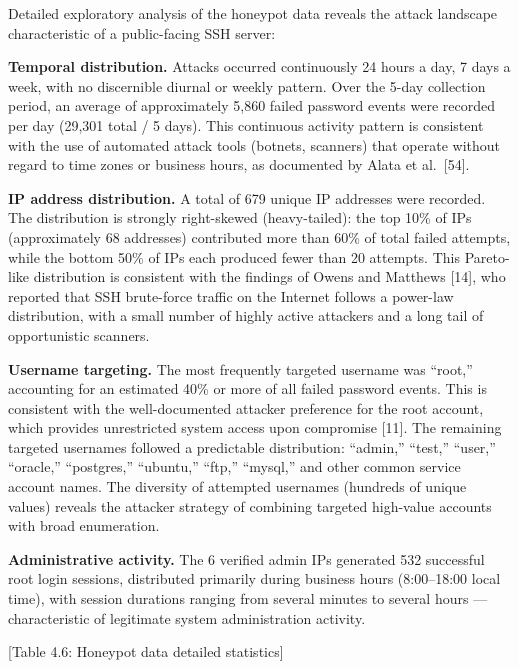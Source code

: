 \documentclass[
  a4paper]{report}
\begin{document}
Detailed exploratory analysis of the honeypot data reveals the attack
landscape characteristic of a public-facing SSH server:

\textbf{Temporal distribution.} Attacks occurred continuously 24 hours a
day, 7 days a week, with no discernible diurnal or weekly pattern. Over
the 5-day collection period, an average of approximately 5,860 failed
password events were recorded per day (29,301 total / 5 days). This
continuous activity pattern is consistent with the use of automated
attack tools (botnets, scanners) that operate without regard to time
zones or business hours, as documented by Alata et al.~{[}54{]}.

\textbf{IP address distribution.} A total of 679 unique IP addresses
were recorded. The distribution is strongly right-skewed (heavy-tailed):
the top 10\% of IPs (approximately 68 addresses) contributed more than
60\% of total failed attempts, while the bottom 50\% of IPs each
produced fewer than 20 attempts. This Pareto-like distribution is
consistent with the findings of Owens and Matthews {[}14{]}, who
reported that SSH brute-force traffic on the Internet follows a
power-law distribution, with a small number of highly active attackers
and a long tail of opportunistic scanners.

\textbf{Username targeting.} The most frequently targeted username was
``root,'' accounting for an estimated 40\% or more of all failed
password events. This is consistent with the well-documented attacker
preference for the root account, which provides unrestricted system
access upon compromise {[}11{]}. The remaining targeted usernames
followed a predictable distribution: ``admin,'' ``test,'' ``user,''
``oracle,'' ``postgres,'' ``ubuntu,'' ``ftp,'' ``mysql,'' and other
common service account names. The diversity of attempted usernames
(hundreds of unique values) reveals the attacker strategy of combining
targeted high-value accounts with broad enumeration.

\textbf{Administrative activity.} The 6 verified admin IPs generated 532
successful root login sessions, distributed primarily during business
hours (8:00--18:00 local time), with session durations ranging from
several minutes to several hours --- characteristic of legitimate system
administration activity.

{[}Table 4.6: Honeypot data detailed statistics{]}
\end{document}
